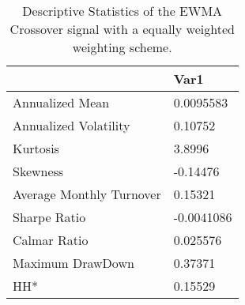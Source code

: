 \begin{table}[H]
\centering
\begin{tabular}{ll}
& Var1 \\ 
\hline 
Annualized Mean & 0.0095583 \\ 
Annualized Volatility & 0.10752 \\ 
Kurtosis & 3.8996 \\ 
Skewness & -0.14476 \\ 
Average Monthly Turnover & 0.15321 \\ 
Sharpe Ratio & -0.0041086 \\ 
Calmar Ratio & 0.025576 \\ 
Maximum DrawDown & 0.37371 \\ 
HH* & 0.15529 \\ 
\hline
\end{tabular}
\caption{Descriptive Statistics of the EWMA Crossover signal with a equally weighted weighting scheme.}
\label{MBBSEWNR}
\end{table}